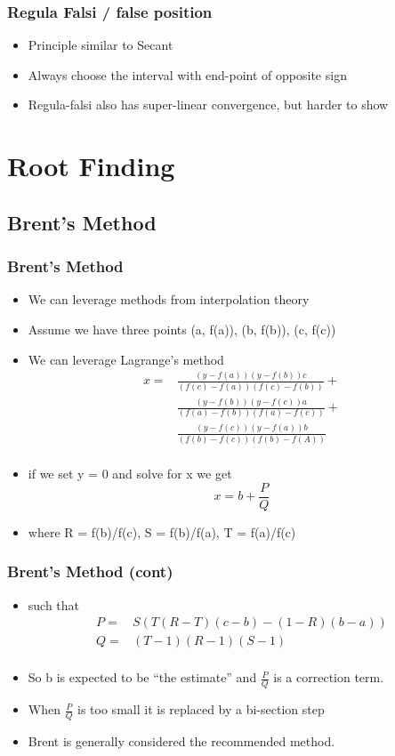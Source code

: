 \documentclass[10pt]{beamer}
\begin{document}
\begin{frame}
  \frametitle{Regula Falsi / false position}
  \begin{itemize}
  \item Principle similar to Secant
  \item Always choose the interval with end-point of opposite sign
  \item Regula-falsi also has super-linear convergence, but harder to show
  \end{itemize}
\end{frame}

\section{Root Finding}

\subsection{Brent's Method}

\begin{frame}
  \frametitle{Brent's Method}
  \begin{itemize}
  \item We can leverage methods from interpolation theory
  \item Assume we have three points  (a, f(a)), (b, f(b)), (c, f(c))
  \item We can leverage Lagrange's method
    \[
      \begin{array}{cc}
      x = &  \frac{(y-f(a))(y-f(b)) c}{(f(c)-f(a))(f(c)-f(b))} +\\
          &  \frac{(y-f(b))(y-f(c)) a}{(f(a)-f(b))(f(a)-f(c))} +\\
          &  \frac{(y-f(c))(y-f(a)) b}{(f(b)-f(c))(f(b)-f(A))}\\
      \end{array}
    \]
  \item if we set y = 0 and solve for x we get
    \[
      x = b + \frac{P}{Q}
    \]
  \item where R = f(b)/f(c), S = f(b)/f(a), T = f(a)/f(c)
  \end{itemize}
\end{frame}

\begin{frame}
  \frametitle{Brent's Method (cont)}
  \begin{itemize}
  \item such that
    \[
      \begin{array}{cc}
        P = &  S(T(R-T)(c-b) - (1-R)(b-a))\\
        Q = & (T-1)(R-1)(S-1)\\
      \end{array}
    \]
  \item So b is expected to be ``the estimate'' and $\frac{P}{Q}$ is a correction term.
  \item When $\frac{P}{Q}$ is too small it is replaced by a bi-section step
  \item Brent is generally considered the recommended method. 
  \end{itemize}
\end{frame}
\end{document}

